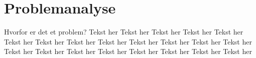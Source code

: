 \section{Problemanalyse}
Hvorfor er det et problem? Tekst her Tekst her Tekst her Tekst her Tekst her Tekst her Tekst her Tekst her Tekst her Tekst her Tekst her Tekst her Tekst her Tekst her Tekst her Tekst her Tekst her Tekst her Tekst her Tekst her Tekst her 

